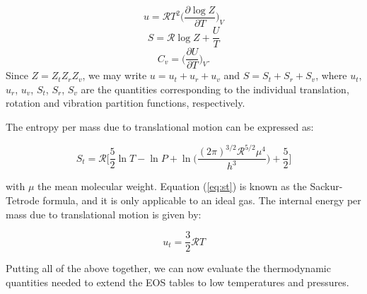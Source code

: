 \documentclass[apj]{emulateapj}
\begin{document}
%
%

\begin{equation}
\label{eq:u}
u=\mathcal{R} T^2 \Big(\frac{\partial \log{Z}}{\partial T}\Big)_{V}
\end{equation}
\begin{equation}
\label{eq:s}
S=\mathcal{R} \log{Z} + \frac{U}{T}
\end{equation}
\begin{equation}
\label{eq:cv}
C_v=\Big(\frac{\partial U}{\partial T}\Big)_{V}.
\end{equation}
Since $Z=Z_t Z_r Z_v$, we may write $u=u_t+u_r+u_v$ and $S=S_t+S_r+S_v$, where $u_t$, $u_r$, $u_v$, $S_t$, $S_r$, $S_v$ are the quantities corresponding to the individual translation, rotation and vibration partition functions, respectively.

The entropy per mass due to translational motion can be expressed as:

\begin{equation}
\label{eq:st}
S_t=\mathcal{R} \Big[ \frac{5}{2} \ln{T} - \ln{P} + \ln \Big( \frac{(2 \pi)^{3/2} \mathcal{R}^{5/2} \mu^4}{h^3}\Big) +\frac{5}{2} \Big]
\end{equation}

\noindent with $\mu$ the mean molecular weight. Equation (\ref{eq:st}) is known as the Sackur-Tetrode formula, and it is only applicable to an ideal gas. The internal energy per mass due to translational motion is given by:

\begin{equation}
\label{eq:ut}
u_t=\frac{3}{2} \mathcal{R} T
\end{equation}

Putting all of the above together, we can now evaluate the thermodynamic quantities needed to extend the \cite{saumon95} EOS tables to low temperatures and pressures.
\end{document}
